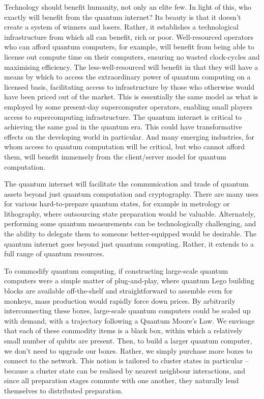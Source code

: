 \documentclass[aps,rmp,twocolumn,amsmath,amssymb,nofootinbib,superscriptaddress,longbibliography,floatfix]{revtex4-1}
\begin{document}
Technology should benefit humanity, not only an elite few. In light of this, who exactly will benefit from the quantum internet? Its beauty is that it doesn't create a system of winners and losers. Rather, it establishes a technological infrastructure from which all can benefit, rich or poor. Well-resourced operators who can afford quantum computers, for example, will benefit from being able to license out compute time on their computers, ensuring no wasted clock-cycles and maximising efficiency. The less-well-resourced will benefit in that they will have a means by which to access the extraordinary power of quantum computing on a licensed basis, facilitating access to infrastructure by those who otherwise would have been priced out of the market. This is essentially the same model as what is employed by some present-day supercomputer operators, enabling small players access to supercomputing infrastructure. The quantum internet is critical to achieving the same goal in the quantum era. This could have transformative effects on the developing world in particular. And many emerging industries, for whom access to quantum computation will be critical, but who cannot afford them, will benefit immensely from the client/server model for quantum computation.

The quantum internet will facilitate the communication and trade of quantum assets beyond just quantum computation and cryptography. There are many uses for various hard-to-prepare quantum states, for example in metrology or lithography, where outsourcing state preparation would be valuable. Alternately, performing some quantum measurements can be technologically challenging, and the ability to delegate them to someone better-equipped would be desirable. The quantum internet goes beyond just quantum computing. Rather, it extends to a full range of quantum resources.

To commodify quantum computing, if constructing large-scale quantum computers were a simple matter of plug-and-play, where quantum Lego building blocks are available off-the-shelf and straightforward to assemble even for monkeys, mass production would rapidly force down prices. By arbitrarily interconnecting these boxes, large-scale quantum computers could be scaled up with demand, with a trajectory following a Quantum Moore's Law. We envisage that each of these commodity items is a black box, within which a relatively small number of qubits are present. Then, to build a larger quantum computer, we don't need to upgrade our boxes. Rather, we simply purchase more boxes to connect to the network. This notion is tailored to cluster states in particular -- because a cluster state can be realised by nearest neighbour interactions, and since all preparation stages commute with one another, they naturally lend themselves to distributed preparation.
\end{document}
